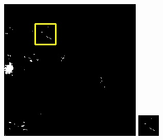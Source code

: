 \documentclass[UTF8]{ctexart}
\begin{document}
\begin{figure}[H]
{\begin{minipage}[b]{0.15\linewidth}
            \includegraphics[width=1\linewidth]{../log/spoon2/cut2/LC81620432014072LGN00_16329_my.jpg}\vspace{4pt}
            \includegraphics[width=1\linewidth]{../log/spoon2/cut2/tmp_cut_LC81620432014072LGN00_16329_my.jpg}\vspace{4pt}

\end{minipage}}
\end{figure}
\end{document}
